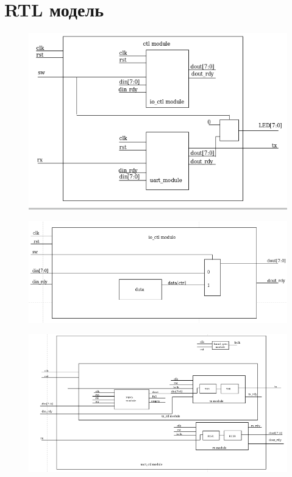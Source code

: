 \documentclass[a4paper, 10pt]{article}
\begin{document}
     \section*{RTL модель}
        \begin{figure}[ht]
            \includegraphics[scale=0.7]{../images/rtl_ctl.png}
        \end{figure}
        \begin{figure}[ht]
            \includegraphics[scale=0.4]{../images/rtl_io.png}
        \end{figure}
        \begin{landscape}
            \begin{figure}[ht]
                \includegraphics{../images/rtl_uart.png}
            \end{figure}
        \end{landscape}
\end{document}
